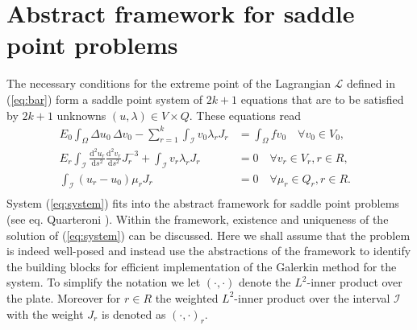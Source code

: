 \documentclass{marine_2015}
\newcommand{\inner}[2]{\ensuremath{\left(#1, #2\right)}}
\newcommand{\rinner}[2]{\ensuremath{\left(#1, #2\right)_r}}
\newcommand{\deriv}[2]{\ensuremath{\frac{\mathrm{d}#1}{\mathrm{d}#2}}}
\begin{document}
\section{Abstract framework for saddle point problems}
\label{sec:abstract}
The necessary conditions for the extreme point of the Lagrangian $\mathcal{L}$
defined in (\ref{eq:bar}) form a saddle point system of $2k+1$ equations that
are to be satisfied by $2k+1$ unknowns $\left(u, \lambda\right)\in V\times Q$. These equations read
\begin{equation}
  \label{eq:system}
  \begin{aligned}
    E_0\displaystyle\int_{\Omega}\Delta u_0\,\Delta v_0-
    \sum_{r=1}^k\int_{\mathcal{I}}v_0\lambda_r J_r &=\displaystyle\int_{\Omega}f
    v_0\quad\forall v_0\in V_0,& \\
    E_r\displaystyle\int_{\mathcal{I}}
    \deriv{^2u_r}{s^2}\deriv{^2v_r}{s^2}J_r^{-3} +
  \int_{\mathcal{I}} v_r \lambda_r J_r &= 0\quad\forall v_r\in V_r, r\in R,&\\
  \int_{\mathcal{I}}\left(u_r-u_0\right)\mu_r J_r &= 0\quad\forall \mu_r\in Q_r,
    r\in R.&\\
  \end{aligned}
\end{equation}
System (\ref{eq:system}) fits into the abstract framework for saddle point
problems (see eq. Quarteroni \cite{quarteroni}). Within the framework, existence
and uniqueness of the solution of (\ref{eq:system}) can be discussed. Here we
shall assume that the problem is indeed well-posed and instead use the abstractions
of the framework to identify the building blocks for efficient implementation
of the Galerkin method for the system. To simplify the notation we
let $\inner{\cdot}{\cdot}$ denote the $L^2$-inner product over the plate.
Moreover for $r\in R$ the weighted $L^2$-inner product over the
interval $\mathcal{I}$ with the weight $J_r$ is denoted as $\rinner{\cdot}{\cdot}$.
\end{document}
